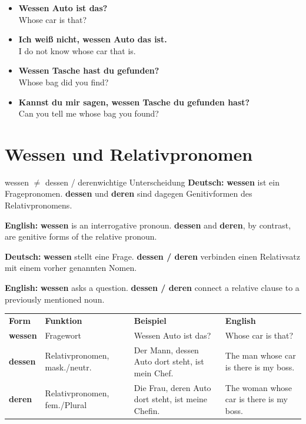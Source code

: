 \documentclass[a4paper,11pt]{article}
\newcommand{\GermanText}[1]{\textbf{Deutsch: }#1\par}
\newcommand{\EnglishText}[1]{{\small\color{SoftGray}\textbf{English: }#1\par}}
\newcommand{\ExampleItem}[2]{\item \textbf{#1}\\{\small\color{SoftGray}#2}}
\begin{document}
        \begin{exbox}
            \begin{itemize}
                \ExampleItem{Wessen Auto ist das?}{Whose car is that?}
                
                \ExampleItem{Ich weiß nicht, wessen Auto das ist.}{I do not know whose car that is.}
                
                \ExampleItem{Wessen Tasche hast du gefunden?}{Whose bag did you find?}
                
                \ExampleItem{Kannst du mir sagen, wessen Tasche du gefunden hast?}{Can you tell me whose bag you found?}
            \end{itemize}
        \end{exbox}
    
    
    \section{Wessen und Relativpronomen}
        
        \begin{grammarentry}{wessen $\neq$ dessen / deren}{wichtige Unterscheidung}
            \GermanText{\textbf{wessen} ist ein Fragepronomen. \textbf{dessen} und \textbf{deren} sind dagegen Genitivformen des Relativpronomens.}
            \EnglishText{\textbf{wessen} is an interrogative pronoun. \textbf{dessen} and \textbf{deren}, by contrast, are genitive forms of the relative pronoun.}
            
            \GermanText{\textbf{wessen} stellt eine Frage. \textbf{dessen / deren} verbinden einen Relativsatz mit einem vorher genannten Nomen.}
            \EnglishText{\textbf{wessen} asks a question. \textbf{dessen / deren} connect a relative clause to a previously mentioned noun.}
        \end{grammarentry}
        
        \begin{longtable}{>{\bfseries}p{3cm}|p{3.2cm}|p{5.3cm}|p{3.2cm}}
            \rowcolor{HeaderBlueDark}
            \color{white}\textbf{Form} &
            \color{white}\textbf{Funktion} &
            \color{white}\textbf{Beispiel} &
            \color{white}\textbf{English} \\
            
            wessen &
            Fragewort &
            Wessen Auto ist das? &
            Whose car is that? \\
            
            dessen &
            Relativpronomen, mask./neutr. &
            Der Mann, dessen Auto dort steht, ist mein Chef. &
            The man whose car is there is my boss. \\
            
            deren &
            Relativpronomen, fem./Plural &
            Die Frau, deren Auto dort steht, ist meine Chefin. &
            The woman whose car is there is my boss. \\
        \end{longtable}
    
\end{document}
